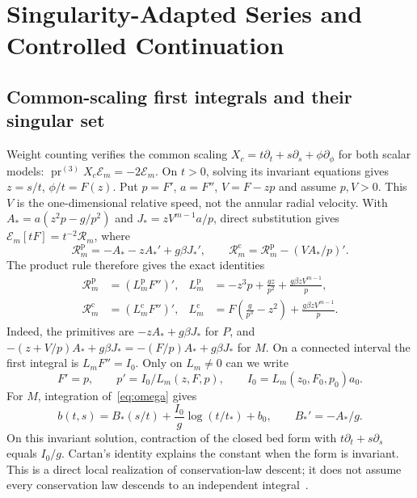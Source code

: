 \documentclass[12pt,a4paper,oneside]{report}
\numberwithin{equation}{chapter}
\theoremstyle{remark}\newtheorem{remark}[theorem]{Remark}
\newcommand{\E}{\mathcal E}
\newcommand{\pr}{\operatorname{pr}}
\begin{document}
\chapter{Singularity-Adapted Series and Controlled Continuation}\label{ch:series}
\section{Common-scaling first integrals and their singular set}
Weight counting verifies the common scaling
$X_c=t\partial_t+s\partial_s+\phi\partial_\phi$ for both scalar models:
$\pr^{(3)}X_c\E_m=-2\E_m$. On $t>0$, solving its invariant equations gives
$z=s/t$, $\phi/t=F(z)$. Put $p=F'$, $a=F''$, $V=F-zp$ and assume
$p,V>0$. This $V$ is the one-dimensional relative speed, not the annular radial velocity. With $A_*=a(z^2p-g/p^2)$ and $J_*=zV^{m-1}a/p$, direct substitution
gives $\E_m[tF]=t^{-2}\mathcal R_m$, where
\[
 \mathcal R_m^{\mathrm p}=-A_*-zA_*'+g\beta J_*',\qquad
 \mathcal R_m^{\mathrm c}=\mathcal R_m^{\mathrm p}-(VA_*/p)'.
\]
The product rule therefore gives the exact identities
\begin{align}
 \mathcal R_m^{\mathrm p}&=(L_m^{\mathrm p}F'')',&
 L_m^{\mathrm p}&=-z^3p+\frac{gz}{p^2}+
                         \frac{g\beta zV^{m-1}}p,\label{eq:Lp}\\
 \mathcal R_m^{\mathrm c}&=(L_m^{\mathrm c}F'')',&
 L_m^{\mathrm c}&=F\!\left(\frac g{p^3}-z^2\right)+
                         \frac{g\beta zV^{m-1}}p.\label{eq:Lc}
\end{align}
Indeed, the primitives are $-zA_*+g\beta J_*$ for $P$, and
$-(z+V/p)A_*+g\beta J_*=-(F/p)A_*+g\beta J_*$ for $M$.
On a connected interval the first integral is $L_mF''=I_0$. Only on
$L_m\ne0$ can we write
\begin{equation}\label{eq:scalar-ivp}
 F'=p,\qquad p'=I_0/L_m(z,F,p),\qquad
 I_0=L_m(z_0,F_0,p_0)a_0.
\end{equation}
For $M$, integration of~\eqref{eq:omega} gives
\begin{equation}\label{eq:material-bed}
 b(t,s)=B_*(s/t)+\frac{I_0}{g}\log(t/t_*)+b_0,
 \qquad B_*'=-A_*/g.
\end{equation}
On this invariant solution, contraction of the closed bed form with
$t\partial_t+s\partial_s$ equals $I_0/g$. Cartan's identity explains the
constant when the form is invariant. This is a direct local realization of
conservation-law descent; it does not assume every conservation law descends
to an independent integral~\cite{druzhkov2024}.
\end{document}
